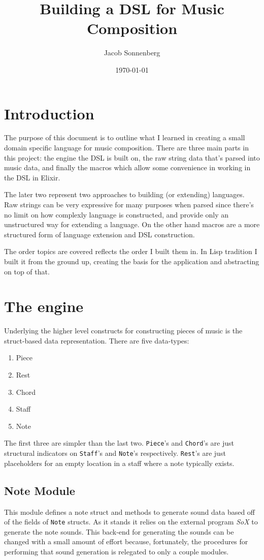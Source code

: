 \documentclass[11pt]{article}
\author{Jacob Sonnenberg}
\date{\today}
\title{Building a DSL for Music Composition}
\begin{document}
\maketitle
\tableofcontents

\section{Introduction}
\label{sec-1}
The purpose of this document is to outline what I learned in
creating a small domain specific language for music
composition. There are three main parts in this project: the engine
the DSL is built on, the raw string data that's parsed into music
data, and finally the macros which allow some convenience in working
in the DSL in Elixir.

The later two represent two approaches to building (or extending)
languages. Raw strings can be very expressive for many purposes when
parsed since there's no limit on how complexly language is
constructed, and provide only an unstructured way for extending a
language. On the other hand macros are a more structured form of
language extension and DSL construction.

The order topics are covered reflects the order I built them in. In
Lisp tradition I built it from the ground up, creating the basis for
the application and abstracting on top of that.
\section{The engine}
\label{sec-2}
Underlying the higher level constructs for constructing pieces of
music is the struct-based data representation. There are five
data-types:
\begin{enumerate}
\item Piece
\item Rest
\item Chord
\item Staff
\item Note
\end{enumerate}
The first three are simpler than the last two. \texttt{Piece}'s and
\texttt{Chord}'s are just structural indicators on \texttt{Staff}'s and \texttt{Note}'s
respectively. \texttt{Rest}'s are just placeholders for an empty location
in a staff where a note typically exists.

\subsection{Note Module}
\label{sec-2-1}
This module defines a note struct and methods to generate sound
data based off of the fields of \texttt{Note} structs. As it stands it
relies on the external program \emph{SoX} to generate the note
sounds. This back-end for generating the sounds can be changed with
a small amount of effort because, fortunately, the procedures for
performing that sound generation is relegated to only a couple
modules.
\end{document}
